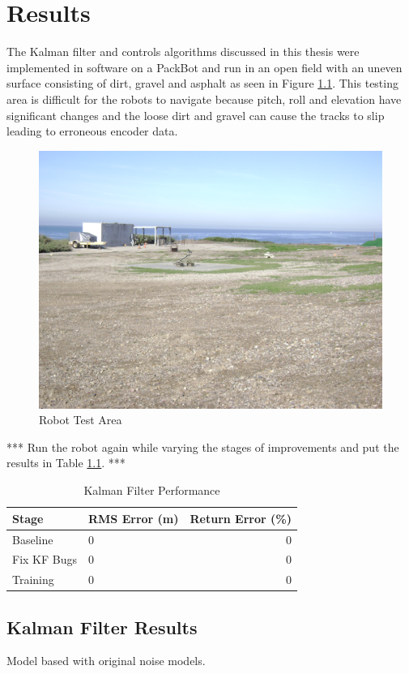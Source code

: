 \chapter{Results}
\label{ch:results}
The Kalman filter and controls algorithms discussed in this thesis were implemented in software on a PackBot and run in an open field with an uneven surface consisting of dirt, gravel and asphalt as seen in Figure \ref{fig:resultsTestArea}. This testing area is difficult for the robots to navigate because pitch, roll and elevation have significant changes and the loose dirt and gravel can cause the tracks to slip leading to erroneous encoder data.

\begin{figure}[ht!]
	\centering
	\includegraphics[width=.75\textwidth]{images/flightFieldTestArea}
	\caption{Robot Test Area}
	\label{fig:resultsTestArea}
\end{figure}

*** Run the robot again while varying the stages of improvements and put the results in Table \ref{tab:resultsKF}. ***
\begin{table}[ht!]
\caption{Kalman Filter Performance}
\small
\centering
\begin{tabular}{@{}llr@{}} \toprule
Stage       & RMS Error (m)  & Return Error (\%) \\ \midrule
Baseline    & 0              & 0                 \\
Fix KF Bugs & 0              & 0                 \\
Training    & 0              & 0                 \\ \bottomrule
\end{tabular}
\label{tab:resultsKF}
\end{table}

\section{Kalman Filter Results}
\label{sec:kfResults}
Model based with original noise models.

